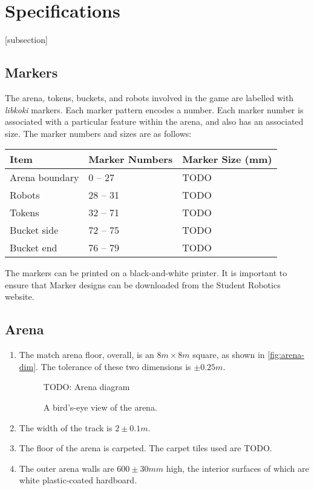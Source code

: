 \section{Specifications}
\label{sec:Specifications}

[subsection]
\newcommand{\rcnii}{\stepcounter{rulei}\arabic{section}.\arabic{subsection}.\arabic{rulei}}
\renewcommand{\labelenumi}{\rcnii}

\subsection{Markers}
\label{sub:markers}
The arena, tokens, buckets, and robots involved in the game are labelled with \textit{libkoki} markers.  Each marker pattern encodes a number.  Each marker number is associated with a particular feature within the arena, and also has an associated size.  The marker numbers and sizes are as follows:

\begin{center}
  \begin{tabular}{lll}
    \toprule
    \textbf{Item} & \textbf{Marker Numbers} & \textbf{Marker Size (mm)} \\
    \midrule
    Arena boundary & 0 -- 27 & TODO \\
    Robots & 28 -- 31 & TODO \\
    Tokens & 32 -- 71 & TODO \\
    Bucket side & 72 -- 75 & TODO \\
    Bucket end & 76 -- 79 & TODO \\
    \bottomrule
  \end{tabular}
\end{center}

The markers can be printed on a black-and-white printer.  It is important to ensure that 
Marker designs can be downloaded from the Student Robotics website.



\subsection{Arena}
\label{sub:arena}
\begin{enumerate}
\item The match arena floor, overall, is an $8m \times 8m$ square, as shown in \autoref{fig:arena-dim}.
 The tolerance of these two dimensions is $\pm0.25m$.

\begin{figure}
  TODO: Arena diagram
  \caption{\label{fig:arena-dim}A bird's-eye view of the arena.}
\end{figure}

\item The width of the track is $2\pm0.1m$.
\item The floor of the arena is carpeted.  The carpet tiles used are TODO.
\item The outer arena walls are $600\pm30mm$ high, the interior surfaces of which are white plastic-coated hardboard.
\end{enumerate}

